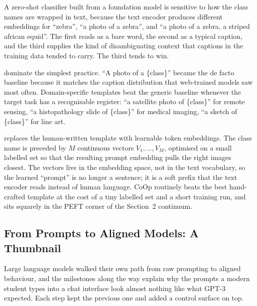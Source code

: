  A zero-shot classifier built from a foundation model is sensitive to how the class names are wrapped in text, because the text encoder produces different embeddings for ``zebra'', ``a photo of a zebra'', and ``a photo of a zebra, a striped african equid''. The first reads as a bare word, the second as a typical caption, and the third supplies the kind of disambiguating context that captions in the training data tended to carry. The third tends to win.

 dominate the simplest practice. ``A photo of a \{class\}'' became the de facto baseline because it matches the caption distribution that web-trained models saw most often. Domain-specific templates beat the generic baseline whenever the target task has a recognisable register: ``a satellite photo of \{class\}'' for remote sensing, ``a histopathology slide of \{class\}'' for medical imaging, ``a sketch of \{class\}'' for line art.

\cite{Zhou2022CoOp} replaces the human-written template with learnable token embeddings. The class name is preceded by $M$ continuous vectors $V_1, \ldots, V_M$, optimised on a small labelled set so that the resulting prompt embedding pulls the right images closest. The vectors live in the embedding space, not in the text vocabulary, so the learned ``prompt'' is no longer a sentence; it is a soft prefix that the text encoder reads instead of human language. CoOp routinely beats the best hand-crafted template at the cost of a tiny labelled set and a short training run, and sits squarely in the PEFT corner of the Section~2 continuum.

\subsection{From Prompts to Aligned Models: A Thumbnail}


 Large language models walked their own path from raw prompting to aligned behaviour, and the milestones along the way explain why the prompts a modern student types into a chat interface look almost nothing like what GPT-3 expected. Each step kept the previous one and added a control surface on top.

